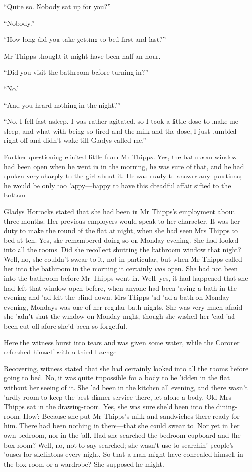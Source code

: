 \enquote{Quite so. Nobody sat up for you?}

\enquote{Nobody.}

\enquote{How long did you take getting to bed first and last?}

Mr Thipps thought it might have been half-an-hour.

\enquote{Did you visit the bathroom before turning in?}

\enquote{No.}

\enquote{And you heard nothing in the night?}

\enquote{No. I fell fast asleep. I was rather agitated, so I took a little dose to make me sleep, and what with being so tired and the milk and the dose, I just tumbled right off and didn’t wake till Gladys called me.}

Further questioning elicited little from Mr Thipps. Yes, the bathroom window had been open when he went in in the morning, he was sure of that, and he had spoken very sharply to the girl about it. He was ready to answer any questions; he would be only too ’appy\allowbreak---\allowbreak happy to have this dreadful affair sifted to the bottom.

Gladys Horrocks stated that she had been in Mr Thipps’s employment about three months. Her previous employers would speak to her character. It was her duty to make the round of the flat at night, when she had seen Mrs Thipps to bed at ten. Yes, she remembered doing so on Monday evening. She had looked into all the rooms. Did she recollect shutting the bathroom window that night? Well, no, she couldn’t swear to it, not in particular, but when Mr Thipps called her into the bathroom in the morning it certainly \textit{was} open. She had not been into the bathroom before Mr Thipps went in. Well, yes, it had happened that she had left that window open before, when anyone had been ’aving a bath in the evening and ’ad left the blind down. Mrs Thipps ’ad ’ad a bath on Monday evening, Mondays was one of her regular bath nights. She was very much afraid she ’adn’t shut the window on Monday night, though she wished her ’ead ’ad been cut off afore she’d been so forgetful.

Here the witness burst into tears and was given some water, while the Coroner refreshed himself with a third lozenge.

Recovering, witness stated that she had certainly looked into all the rooms before going to bed. No, it was quite impossible for a body to be ’idden in the flat without her seeing of it. She ’ad been in the kitchen all evening, and there wasn’t ’ardly room to keep the best dinner service there, let alone a body. Old Mrs Thipps sat in the drawing-room. Yes, she was sure she’d been into the dining-room. How? Because she put Mr Thipps’s milk and sandwiches there ready for him. There had been nothing in there\allowbreak---\allowbreak that she could swear to. Nor yet in her own bedroom, nor in the ’all. Had she searched the bedroom cupboard and the box-room? Well, no, not to say searched; she wasn’t use to searchin’ people’s ’ouses for skelintons every night. So that a man might have concealed himself in the box-room or a wardrobe? She supposed he might.

